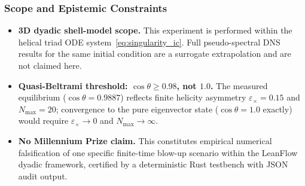 \subsubsection*{Scope and Epistemic Constraints}
\begin{itemize}
  \item \textbf{3D dyadic shell-model scope.}
        This experiment is performed within the helical triad ODE system~\eqref{eq:singularity_ic}.
        Full pseudo-spectral DNS results for the same initial condition are a
        surrogate extrapolation and are not claimed here.
  \item \textbf{Quasi-Beltrami threshold: $\cos\theta \ge 0.98$, not $1.0$.}
        The measured equilibrium ($\cos\theta = 0.9887$) reflects finite helicity
        asymmetry $\varepsilon_{\times} = 0.15$ and $N_{\max} = 20$; convergence to
        the pure eigenvector state ($\cos\theta = 1.0$ exactly) would require
        $\varepsilon_{\times} \to 0$ and $N_{\max} \to \infty$.
  \item \textbf{No Millennium Prize claim.}
        This constitutes empirical numerical falsification of one specific
        finite-time blow-up scenario within the LeanFlow dyadic framework,
        certified by a deterministic Rust testbench with JSON audit output.
\end{itemize}
